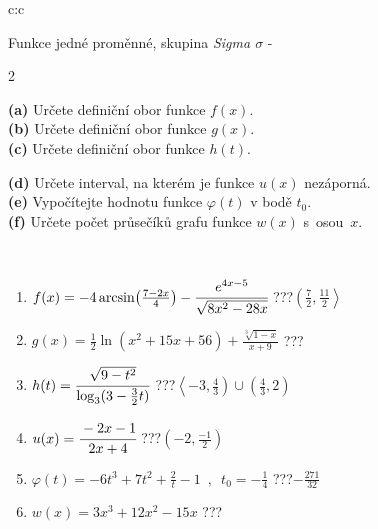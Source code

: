 \documentclass[10pt]{report}
\begin{document}
\begin{tabular}{c:c}
\begin{minipage}[c][104.5mm][t]{0.5\linewidth}
\begin{center}
\vspace{7mm}
{\huge Funkce jedné proměnné, skupina \textit{Sigma $\sigma$} -}\\[5mm]
\begin{minipage}{0.95\linewidth}
\begin{center}
{\small \begin{multicols}{2} \raggedright
\textbf{(a)} Určete definiční obor funkce \(f(x)\). \\[1mm]
\textbf{(b)} Určete definiční obor funkce \(g(x)\). \\[1mm]
\textbf{(c)} Určete definiční obor funkce \(h(t)\). \par \columnbreak
\textbf{(d)} Určete interval, na kterém je funkce \(u(x)\) nezáporná. \\[1mm]
\textbf{(e)} Vypočítejte hodnotu funkce \(\varphi(t)\) v bodě \(t_0\). \\[1mm]
\textbf{(f)} Určete počet průsečíků grafu funkce \(w(x)\) s~osou~\(x\). \\[1mm]
\end{multicols}
}
\end{center}
\end{minipage}
\\[4mm]
\begin{minipage}{0.79\linewidth}
\begin{center}
\begin{varwidth}{\linewidth}
\begin{enumerate}
\small
\item $f(x) = -4\arcsin\!\left( \frac{7-2x}{4} \right) - \cfrac{e^{4x-5}}{\sqrt{8x^2-28x}}$\quad \dotfill\; ???\;\dotfill \quad $\left(\frac{7}{2} , \frac{11}{2}\right\rangle$
\item $g(x) = \frac{1}{2} \ln{\!(x^2+15x+56)}+\frac{\sqrt[3]{1-x}}{x+9}$\quad \dotfill\; ???\;\dotfill {}
\item $h(t) = \cfrac{\sqrt{9-t^2}}{\log_3(3-\frac{3}{2}t)}$\quad \dotfill\; ???\;\dotfill \quad $\left\langle-3 , \frac{4}{3}\right)\cup\left(\frac{4}{3} , 2\right)$
\item $u(x) = \cfrac{-2x-1}{2x+4}$\quad \dotfill\; ???\;\dotfill \quad $\left(-2 , \frac{-1}{2}\right)$
\item $\varphi(t) = -6t^3+7t^2+\frac{2}{t}-1 \enspace , \enspace t_0=-\frac{1}{4}$\quad \dotfill\; ???\;\dotfill \quad $-\frac{271}{32}$
\item $w(x) = 3x^3+12x^2-15x$\quad \dotfill\; ???\;\dotfill {}

\end{enumerate}
\end{varwidth}
\end{center}
\end{minipage}
\end{center}
\end{minipage}
\end{tabular}
\end{document}
